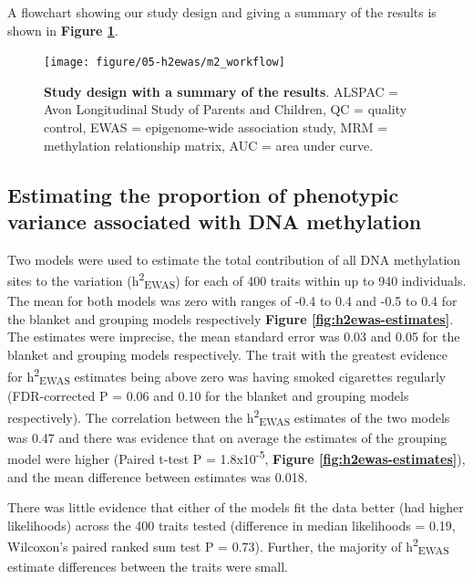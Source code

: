 \documentclass[11pt,oneside]{bristolthesis}
\begin{document}
A flowchart showing our study design and giving a summary of the results is shown in \textbf{Figure \ref{fig:h2ewas-study-design}}.




\begin{figure}

{\centering \texttt{[image: figure/05-h2ewas/m2\_workflow]} 

}

\caption[Study design with a summary of the results]{\textbf{Study design with a summary of the results}. ALSPAC = Avon Longitudinal Study of Parents and Children, QC = quality control, EWAS = epigenome-wide association study, MRM = methylation relationship matrix, AUC = area under curve.}\label{fig:h2ewas-study-design}
\end{figure}
\hypertarget{estimating-h2ewas}{%
\subsection{Estimating the proportion of phenotypic variance associated with DNA methylation}\label{estimating-h2ewas}}

Two models were used to estimate the total contribution of all DNA methylation sites to the variation (h\textsuperscript{2}\textsubscript{EWAS}) for each of 400 traits within up to 940 individuals. The mean for both models was zero with ranges of -0.4 to 0.4 and -0.5 to 0.4 for the blanket and grouping models respectively \textbf{Figure \ref{fig:h2ewas-estimates}}. The estimates were imprecise, the mean standard error was 0.03 and 0.05 for the blanket and grouping models respectively. The trait with the greatest evidence for h\textsuperscript{2}\textsubscript{EWAS} estimates being above zero was having smoked cigarettes regularly (FDR-corrected P = 0.06 and 0.10 for the blanket and grouping models respectively). The correlation between the h\textsuperscript{2}\textsubscript{EWAS} estimates of the two models was 0.47 and there was evidence that on average the estimates of the grouping model were higher (Paired t-test P = 1.8x10\textsuperscript{-5}, \textbf{Figure \ref{fig:h2ewas-estimates}}), and the mean difference between estimates was 0.018.

There was little evidence that either of the models fit the data better (had higher likelihoods) across the 400 traits tested (difference in median likelihoods = 0.19, Wilcoxon's paired ranked sum test P = 0.73). Further, the majority of h\textsuperscript{2}\textsubscript{EWAS} estimate differences between the traits were small.
\end{document}
